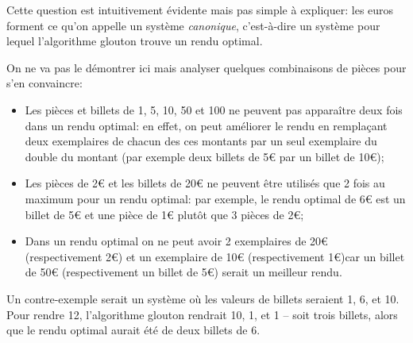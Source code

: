 \documentclass[12pt]{article}
\begin{document}
	\begin{MaReponse}
		Cette question est intuitivement évidente mais pas simple à expliquer: les euros forment ce qu'on appelle un système \textit{canonique}, c'est-à-dire un système pour lequel l'algorithme glouton trouve un rendu optimal. 
		
		On ne va pas le démontrer ici mais analyser quelques combinaisons de pièces pour s'en convaincre:
		\begin{itemize}
			\item Les pièces et billets de 1, 5, 10, 50 et 100 ne peuvent pas apparaître deux fois dans un rendu optimal: en effet, on peut améliorer le rendu en remplaçant deux exemplaires de chacun des ces montants par un seul exemplaire du double du montant (par exemple deux billets de 5\euro{} par un billet de 10\euro{)};
			\item Les pièces de 2\euro{} et les billets de 20\euro{} ne peuvent être utilisés que 2 fois au maximum pour un rendu optimal: par exemple, le rendu optimal de 6\euro{} est un billet de 5\euro{} et une pièce de 1\euro{} plutôt que 3 pièces de 2\euro{};
			\item Dans un rendu optimal on ne peut avoir 2 exemplaires de 20\euro{} (respectivement 2\euro{}) et un exemplaire de 10\euro{} (respectivement 1\euro{})car un billet de 50\euro{} (respectivement un billet de 5\euro{}) serait un meilleur rendu.
		\end{itemize}
		
		Un contre-exemple serait un système où les valeurs de billets seraient 1, 6, et 10. Pour rendre 12, l'algorithme glouton rendrait 10, 1, et 1 -- soit trois billets, alors que le rendu optimal aurait été de deux billets de 6.
	\end{MaReponse}
	
\end{document}
